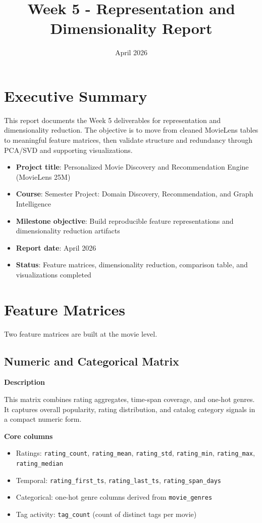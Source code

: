 \documentclass[11pt]{article}
\title{Week 5 - Representation and Dimensionality Report}
\date{April 2026}
\begin{document}
\maketitle

\section{Executive Summary}

This report documents the Week 5 deliverables for representation and dimensionality reduction. The objective is to move from cleaned MovieLens tables to meaningful feature matrices, then validate structure and redundancy through PCA/SVD and supporting visualizations.

\begin{itemize}[leftmargin=1.5em]
    \item \textbf{Project title}: Personalized Movie Discovery and Recommendation Engine (MovieLens 25M)
    \item \textbf{Course}: Semester Project: Domain Discovery, Recommendation, and Graph Intelligence
    \item \textbf{Milestone objective}: Build reproducible feature representations and dimensionality reduction artifacts
    \item \textbf{Report date}: April 2026
    \item \textbf{Status}: Feature matrices, dimensionality reduction, comparison table, and visualizations completed
\end{itemize}

\section{Feature Matrices}

Two feature matrices are built at the movie level.

\subsection{Numeric and Categorical Matrix}

\textbf{Description}

This matrix combines rating aggregates, time-span coverage, and one-hot genres. It captures overall popularity, rating distribution, and catalog category signals in a compact numeric form.

\textbf{Core columns}

\begin{itemize}[leftmargin=1.5em]
    \item Ratings: \texttt{rating\_count}, \texttt{rating\_mean}, \texttt{rating\_std}, \texttt{rating\_min}, \texttt{rating\_max}, \texttt{rating\_median}
    \item Temporal: \texttt{rating\_first\_ts}, \texttt{rating\_last\_ts}, \texttt{rating\_span\_days}
    \item Categorical: one-hot genre columns derived from \texttt{movie\_genres}
    \item Tag activity: \texttt{tag\_count} (count of distinct tags per movie)
\end{itemize}
\end{document}
